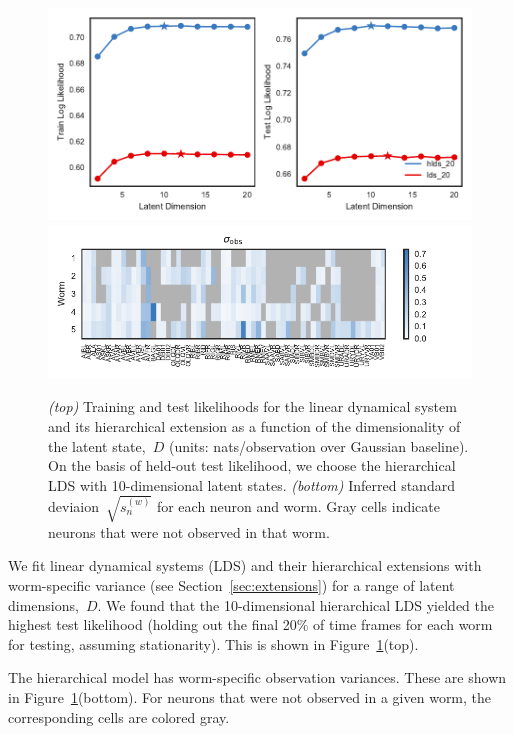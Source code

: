 \documentclass{article}
\begin{document}
\begin{figure}[h]
  \centering
  \includegraphics[width=6in]{figures/lds/dimensionality} \\
  \includegraphics[width=5.5in]{figures/lds/observation_variance} 
  \caption{\textit{(top)} Training and test likelihoods for the linear
    dynamical system and its hierarchical extension as a function of
    the dimensionality of the latent state,~$D$ (units:
    nats/observation over Gaussian baseline). On the basis of held-out
    test likelihood, we choose the hierarchical LDS with
    10-dimensional latent states.  \textit{(bottom)} Inferred standard
    deviaion~$\sqrt{s_n^{(w)}}$ for each neuron and worm.  Gray cells
    indicate neurons that were not observed in that worm.}
  \label{fig:lds}
\end{figure}

We fit linear dynamical systems (LDS) and their hierarchical
extensions with worm-specific variance (see Section~\ref{sec:extensions})
for a range of latent dimensions,~$D$.  We found that the
10-dimensional hierarchical LDS yielded the highest test
likelihood (holding out the final 20\% of time frames for
each worm for testing, assuming stationarity). This is
shown in Figure~\ref{fig:lds}(top).

The hierarchical model has worm-specific observation variances.
These are shown in Figure~\ref{fig:lds}(bottom).  For neurons that
were not observed in a given worm, the corresponding cells are
colored gray. 
\end{document}
